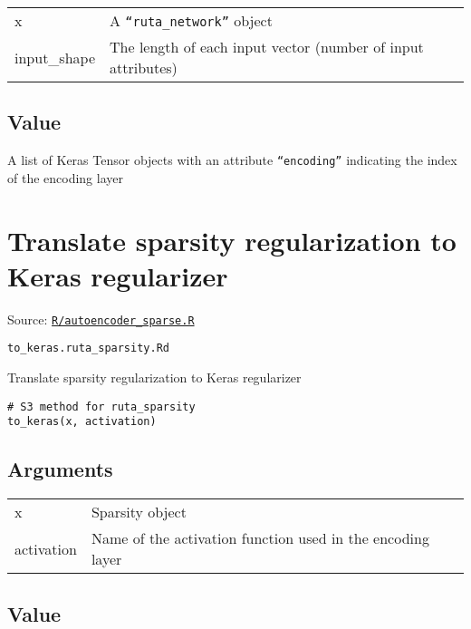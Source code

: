 \begin{longtable}[c]{@{}>{\small}p{3cm}>{\raggedright}p{12.5cm}@{}}
\toprule
x & A \texttt{``ruta\_network''} object\tabularnewline
input\_shape & The length of each input vector (number of input
attributes)\tabularnewline
\bottomrule
\end{longtable}

\hypertarget{value}{\subsection{\texorpdfstring{\protect\hyperlink{value}{}Value}{Value}}\label{value}}

A list of Keras Tensor objects with an attribute \texttt{``encoding''}
indicating the index of the encoding layer

\section{Translate sparsity regularization to Keras
regularizer}\label{translate-sparsity-regularization-to-keras-regularizer}

Source:
\href{https://github.com/fdavidcl/ruta/blob/master/R/autoencoder_sparse.R}{\texttt{R/autoencoder\_sparse.R}}

\texttt{to\_keras.ruta\_sparsity.Rd}

Translate sparsity regularization to Keras regularizer

\begin{verbatim}
# S3 method for ruta_sparsity
to_keras(x, activation)
\end{verbatim}

\hypertarget{arguments}{\subsection{\texorpdfstring{\protect\hyperlink{arguments}{}Arguments}{Arguments}}\label{arguments}}

\begin{longtable}[c]{@{}>{\small}p{3cm}>{\raggedright}p{12.5cm}@{}}
\toprule
x & Sparsity object\tabularnewline
activation & Name of the activation function used in the encoding
layer\tabularnewline
\bottomrule
\end{longtable}

\hypertarget{value}{\subsection{\texorpdfstring{\protect\hyperlink{value}{}Value}{Value}}\label{value}}

